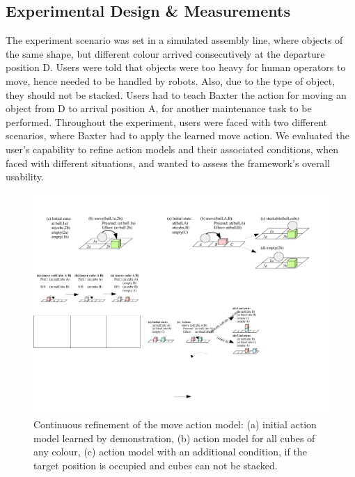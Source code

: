 \subsection{Experimental Design \& Measurements}
The experiment scenario was set in a simulated assembly line, where objects of the same shape, but different colour arrived consecutively at the departure position D.
Users were told that objects were too heavy for human operators to move, hence needed to be handled by robots.
Also, due to the type of object, they should not be stacked.
Users had to teach Baxter the action for moving an object from D to arrival position A, for another maintenance task to be performed.
Throughout the experiment, users were faced with two different scenarios, where Baxter had to apply the learned move action. 
We evaluated the user's capability to refine action models and their associated conditions, when faced with different situations, and wanted to assess the framework's overall usability.

\begin{figure}[h]
	\centering
	\includegraphics[width=0.8\linewidth]{figures/scenarios-exp2}
	\caption{Continuous refinement of the move action model: (a) initial action model learned by demonstration, (b) action model for all cubes of any colour, (c) action model with an additional condition, if the target position is occupied and cubes can not be stacked.}
	\label{fig:scenarios-exp2}
\end{figure} 

